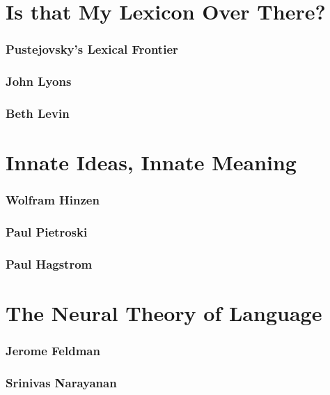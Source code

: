\section{Is that My Lexicon Over There?}
\subsubsection{Pustejovsky's Lexical Frontier}
\subsubsection{John Lyons}
\subsubsection{Beth Levin}

\section{Innate Ideas, Innate Meaning}
\subsubsection{Wolfram Hinzen}
\subsubsection{Paul Pietroski}
\subsubsection{Paul Hagstrom}

\section{The Neural Theory of Language}
\subsubsection{Jerome Feldman}
\subsubsection{Srinivas Narayanan}


\section{}
\section{}
\section{}








